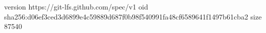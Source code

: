 version https://git-lfs.github.com/spec/v1
oid sha256:d06ef3ced3d6899e4c59889d687f0b98f540991fa48cf6589641f1497b61cba2
size 87540

